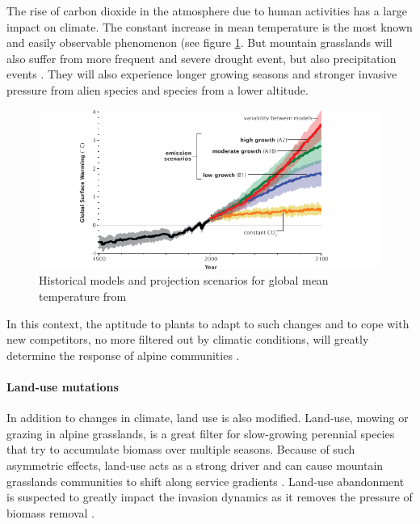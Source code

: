 The rise of carbon dioxide in the atmosphere due to human activities has a large impact on climate. The constant increase in mean temperature is the most known and easily observable phenomenon (see figure \ref{fig:climate}. But mountain grasslands will also suffer from more frequent and severe drought event, but also precipitation events \parencite{beniston_climate_1997, solomon_climate_2007, intergovernmental_panel_on_climate_change_climate_2014}. They will also experience longer growing seasons and stronger invasive pressure from alien species and species from a lower altitude.


\begin{figure}
    \includegraphics[width=1\linewidth]{./1_Introduction/graphics/ipcc_scenarios.png}
  \caption[IPCC scenarios for global mean temperature]{Historical models and projection scenarios for global mean temperature from \cite{solomon_climate_2007} }
  \label{fig:climate}
\end{figure}

In this context, the aptitude to plants to adapt to such changes and to cope with new competitors, no more filtered out by climatic conditions, will greatly determine the response of alpine communities \parencite{alexander_novel_2015}.

\paragraph{Land-use mutations}

In addition to changes in climate, land use is also modified.  Land-use, mowing or grazing in alpine grasslands, is a great filter for slow-growing perennial species that try to accumulate biomass over multiple seasons. Because of such asymmetric effects, land-use acts as a strong driver and can cause mountain grasslands communities to shift along service gradients \parencite{schirpke_multiple_2012}. Land-use abandonment is suspected to greatly impact the invasion dynamics as it removes the pressure of biomass removal \parencite{carboni_simulating_2017}. 

